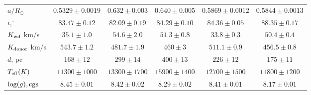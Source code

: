 \begin{landscape}
\begin{table*}
\begin{tabular}{lccccc}
                $a/R_{\odot}$               & $0.5329\pm0.0019$     & $0.632\pm0.003$       & $0.640\pm0.005$       & $0.5869\pm0.0012$     & $0.5844\pm0.0013$     \\
                $i, ^\circ$                 & $83.47\pm0.12$        & $82.09\pm0.19$        & $84.29\pm0.10$        & $84.36\pm0.05$        & $88.35\pm0.17$        \\
                $K_{\rm wd}$ km/s           & $35.1\pm1.0$          & $54.6\pm2.0$          & $51.3\pm0.8$          & $33.8\pm0.3$          & $50.4\pm0.4$          \\
                $K_{\rm donor}$ km/s        & $543.7\pm1.2$         & $481.7\pm1.9$         & $460\pm3$             & $511.1\pm0.9$         & $456.5\pm0.8$         \\
                \hline
                $d$, pc                     & $168\pm12$            & $299\pm14$            & $400\pm13$            & $226\pm12$            & $175\pm11$            \\
                $T_{\rm eff} (K)$           & $11300\pm1000$        & $13300\pm1700$        & $15900\pm1400$        & $12700\pm1500$        & $11800\pm1200$        \\
                $\log(g), {\rm cgs}$        & $8.45\pm0.01$         & $8.42\pm0.02$         & $8.29\pm0.02$         & $8.41\pm0.01$         & $8.17\pm0.01$         \\
                \hline
                \hline
            \end{tabular}
        \end{table*}



\end{landscape}
